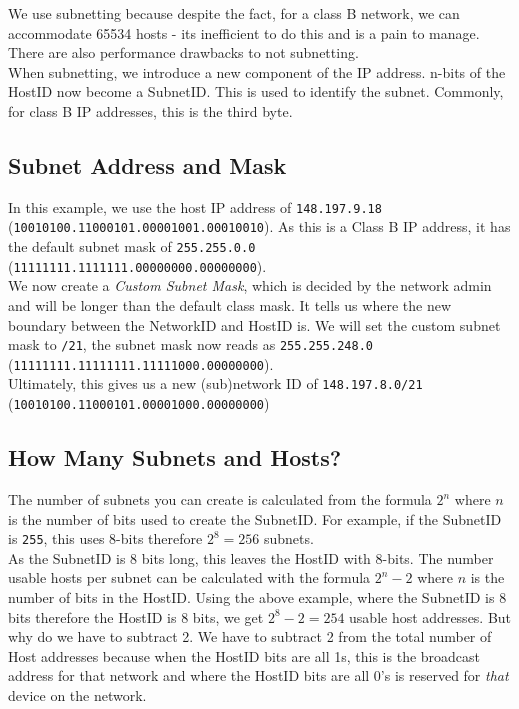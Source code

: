 We use subnetting because despite the fact, for a class B network, we can accommodate 65534 hosts - its inefficient to do this and is a pain to manage. There are also performance drawbacks to not subnetting.\\

When subnetting, we introduce a new component of the IP address. n-bits of the HostID now become a SubnetID. This is used to identify the subnet. Commonly, for class B IP addresses, this is the third byte.

\subsection{Subnet Address and Mask}
In this example, we use the host IP address of \verb|148.197.9.18|\\ (\verb|10010100.11000101.00001001.00010010|). As this is a Class B IP address, it has the default subnet mask of \verb|255.255.0.0| (\verb|11111111.1111111.00000000.00000000|).\\

We now create a \textit{Custom Subnet Mask}, which is decided by the network admin and will be longer than the default class mask. It tells us where the new boundary between the NetworkID and HostID is. We will set the custom subnet mask to \verb|/21|, the subnet mask now reads as \verb|255.255.248.0|\\ (\verb|11111111.11111111.11111000.00000000|).\\

Ultimately, this gives us a new (sub)network ID of \verb|148.197.8.0/21|\\ (\verb|10010100.11000101.00001000.00000000|)

\subsection{How Many Subnets and Hosts?}
The number of subnets you can create is calculated from the formula $2^n$ where $n$ is the number of bits used to create the SubnetID. For example, if the SubnetID is \verb|255|, this uses 8-bits therefore $2^8=256$ subnets.\\

As the SubnetID is 8 bits long, this leaves the HostID with 8-bits. The number usable hosts per subnet can be calculated with the formula $2^n - 2$ where $n$ is the number of bits in the HostID. Using the above example, where the SubnetID is 8 bits therefore the HostID is 8 bits, we get $2^8 - 2 = 254$ usable host addresses. But why do we have to subtract 2. We have to subtract 2 from the total number of Host addresses because when the HostID bits are all 1s, this is the broadcast address for that network and where the HostID bits are all 0's is reserved for \textit{that} device on the network.